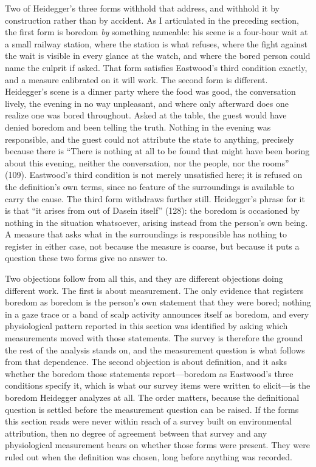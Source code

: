 Two of Heidegger's three forms withhold that address, and withhold it by construction rather
than by accident. As I articulated in the preceding section, the first form is boredom
\textit{by} something nameable: his scene is a four-hour wait at a small railway station, where
the station is what refuses, where the fight against the wait is visible in every glance at the
watch, and where the bored person could name the culprit if asked. That form satisfies
Eastwood's third condition exactly, and a measure calibrated on it will work. The second form
is different. Heidegger's scene is a dinner party where the food was good, the conversation
lively, the evening in no way unpleasant, and where only afterward does one realize one was
bored throughout. Asked at the table, the guest would have denied boredom and been telling the
truth. Nothing in the evening was responsible, and the guest could not attribute the state to
anything, precisely because there is ``There is nothing at all to be found that might have been boring about this evening, neither the conversation, nor the people, nor the rooms'' (109). Eastwood's third condition is not merely
unsatisfied here; it is refused on the definition's own terms, since no feature of the
surroundings is available to carry the cause. The third form withdraws further still.
Heidegger's phrase for it is that ``it arises from out of Dasein itself'' (128): the boredom is occasioned by nothing in the
situation whatsoever, arising instead from the person's own being. A measure that asks what in
the surroundings is responsible has nothing to register in either case, not because the measure
is coarse, but because it puts a question these two forms give no answer to.

Two objections follow from all this, and they are different objections doing different work.
The first is about measurement. The only evidence that registers boredom as boredom is the
person's own statement that they were bored; nothing in a gaze trace or a band of scalp
activity announces itself as boredom, and every physiological pattern reported in this section
was identified by asking which measurements moved with those statements. The survey is
therefore the ground the rest of the analysis stands on, and the measurement question is what
follows from that dependence. The second objection is about definition, and it asks whether the
boredom those statements report---boredom as Eastwood's three conditions specify it, which is
what our survey items were written to elicit---is the boredom Heidegger analyzes at all. The
order matters, because the definitional question is settled before the measurement question can
be raised. If the forms this section reads were never within reach of a survey built on
environmental attribution, then no degree of agreement between that survey and any physiological
measurement bears on whether those forms were present. They were ruled out when the definition
was chosen, long before anything was recorded.


